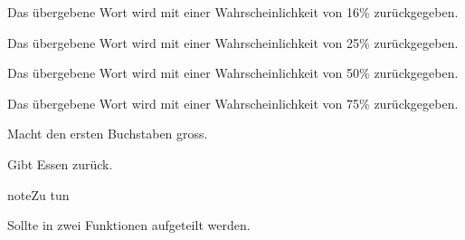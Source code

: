 \documentclass[a4paper,12pt,oneside]{sphinxmanual}
\begin{document}
\begin{fulllineitems}
\label{funktionen:pyzufall.e16}
Das übergebene Wort wird mit einer Wahrscheinlichkeit von 16\% zurückgegeben.

\end{fulllineitems}


\begin{fulllineitems}
\label{funktionen:pyzufall.e25}
Das übergebene Wort wird mit einer Wahrscheinlichkeit von 25\% zurückgegeben.

\end{fulllineitems}


\begin{fulllineitems}
\label{funktionen:pyzufall.e50}
Das übergebene Wort wird mit einer Wahrscheinlichkeit von 50\% zurückgegeben.

\end{fulllineitems}


\begin{fulllineitems}
\label{funktionen:pyzufall.e75}
Das übergebene Wort wird mit einer Wahrscheinlichkeit von 75\% zurückgegeben.

\end{fulllineitems}


\begin{fulllineitems}
\label{funktionen:pyzufall.ersten_buchstaben_gross}
Macht den ersten Buchstaben gross.

\end{fulllineitems}


\begin{fulllineitems}
\label{funktionen:pyzufall.essen}
Gibt Essen zurück.

\begin{notice}{note}{Zu tun}

Sollte in zwei Funktionen aufgeteilt werden.
\end{notice}

\end{fulllineitems}
\end{document}
